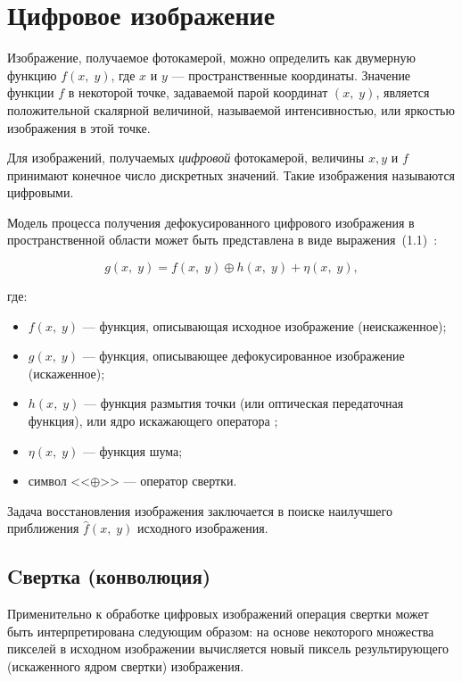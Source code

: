 \section{Цифровое изображение}

Изображение, получаемое фотокамерой, можно определить как двумерную функцию $f(x,\;y)$, где $x$ и $y$ --- пространственные координаты. Значение функции $f$ в некоторой точке, задаваемой парой координат $(x,\;y)$, является положительной скалярной величиной, называемой интенсивностью, или яркостью изображения в этой точке.~\cite{gonsales}

Для изображений, получаемых \textit{цифровой} фотокамерой, величины $x, y$ и $f$ принимают конечное число дискретных значений. Такие изображения называются цифровыми.

Модель процесса получения дефокусированного цифрового изображения в пространственной области может быть представлена в виде выражения~(1.1)~\cite{defocus_model}:

\begin{equation}
	g(x,\;y) = f(x,\;y) \oplus h(x,\;y) + \eta(x,\;y),
\end{equation}

где: 

\begin{itemize}
	\item $f(x,\;y)$ --- функция, описывающая исходное изображение (неискаженное);
	\item $g(x,\;y)$ --- функция, описывающее дефокусированное изображение (искаженное);
	\item $h(x,\;y)$ --- функция размытия точки (или оптическая передаточная функция), или ядро искажающего оператора \cite{frt};
	\item $\eta(x,\;y)$ --- функция шума;
	\item символ <<$\oplus$>> --- оператор свертки.
\end{itemize}

Задача восстановления изображения заключается в поиске наилучшего приближения $\hat{f}(x,\;y)$ исходного изображения.

\subsection*{Cвертка (конволюция)}

Применительно к обработке цифровых изображений операция свертки может быть интерпретирована следующим образом: на основе некоторого множества пикселей в исходном изображении вычисляется новый пиксель результирующего (искаженного ядром свертки) изображения.

